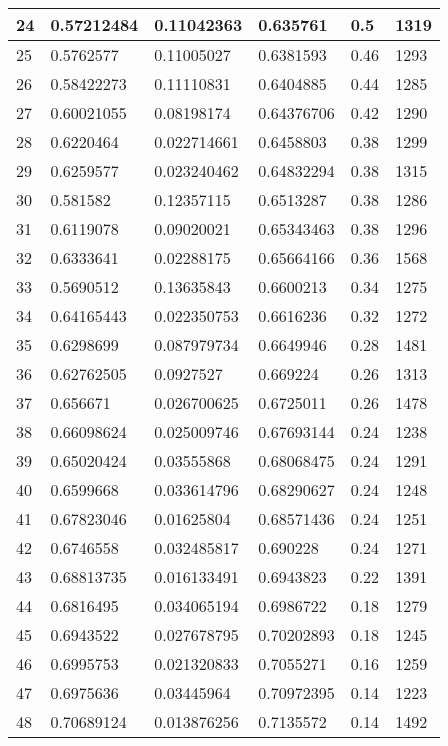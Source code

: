 \begin{longtable}{|l|l|l|l|l|l|}
24 & 0.57212484 & 0.11042363 & 0.635761 & 0.5 & 1319 \\ \hline 
25 & 0.5762577 & 0.11005027 & 0.6381593 & 0.46 & 1293 \\ \hline 
26 & 0.58422273 & 0.11110831 & 0.6404885 & 0.44 & 1285 \\ \hline 
27 & 0.60021055 & 0.08198174 & 0.64376706 & 0.42 & 1290 \\ \hline 
28 & 0.6220464 & 0.022714661 & 0.6458803 & 0.38 & 1299 \\ \hline 
29 & 0.6259577 & 0.023240462 & 0.64832294 & 0.38 & 1315 \\ \hline 
30 & 0.581582 & 0.12357115 & 0.6513287 & 0.38 & 1286 \\ \hline 
31 & 0.6119078 & 0.09020021 & 0.65343463 & 0.38 & 1296 \\ \hline 
32 & 0.6333641 & 0.02288175 & 0.65664166 & 0.36 & 1568 \\ \hline 
33 & 0.5690512 & 0.13635843 & 0.6600213 & 0.34 & 1275 \\ \hline 
34 & 0.64165443 & 0.022350753 & 0.6616236 & 0.32 & 1272 \\ \hline 
35 & 0.6298699 & 0.087979734 & 0.6649946 & 0.28 & 1481 \\ \hline 
36 & 0.62762505 & 0.0927527 & 0.669224 & 0.26 & 1313 \\ \hline 
37 & 0.656671 & 0.026700625 & 0.6725011 & 0.26 & 1478 \\ \hline 
38 & 0.66098624 & 0.025009746 & 0.67693144 & 0.24 & 1238 \\ \hline 
39 & 0.65020424 & 0.03555868 & 0.68068475 & 0.24 & 1291 \\ \hline 
40 & 0.6599668 & 0.033614796 & 0.68290627 & 0.24 & 1248 \\ \hline 
41 & 0.67823046 & 0.01625804 & 0.68571436 & 0.24 & 1251 \\ \hline 
42 & 0.6746558 & 0.032485817 & 0.690228 & 0.24 & 1271 \\ \hline 
43 & 0.68813735 & 0.016133491 & 0.6943823 & 0.22 & 1391 \\ \hline 
44 & 0.6816495 & 0.034065194 & 0.6986722 & 0.18 & 1279 \\ \hline 
45 & 0.6943522 & 0.027678795 & 0.70202893 & 0.18 & 1245 \\ \hline 
46 & 0.6995753 & 0.021320833 & 0.7055271 & 0.16 & 1259 \\ \hline 
47 & 0.6975636 & 0.03445964 & 0.70972395 & 0.14 & 1223 \\ \hline 
48 & 0.70689124 & 0.013876256 & 0.7135572 & 0.14 & 1492 \\ \hline 

\end{longtable}
